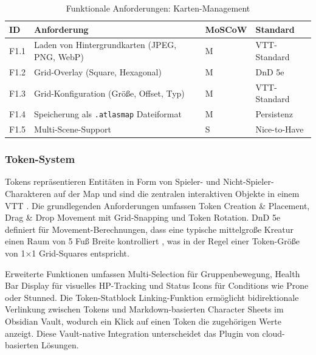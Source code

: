 \begin{table}[htbp]
	\centering
	\small
	\caption{Funktionale Anforderungen: Karten-Management}
	\label{tab:funktionale-anforderungen-karten}
	\begin{tabularx}{\textwidth}{llXl}
		\toprule
		\textbf{ID} & \textbf{Anforderung}                                         & \textbf{MoSCoW} & \textbf{Standard} \\
		\midrule
		F1.1        & Laden von Hintergrundkarten (\ac{JPEG}, \ac{PNG}, \ac{WebP}) & M               & \ac{VTT}-Standard \\
		F1.2        & Grid-Overlay (Square, Hexagonal)                             & M               & \ac{DnD} 5e       \\
		F1.3        & Grid-Konfiguration (Größe, Offset, Typ)                      & M               & \ac{VTT}-Standard \\
		F1.4        & Speicherung als \texttt{.atlasmap} Dateiformat               & M               & Persistenz        \\
		F1.5        & Multi-Scene-Support                                          & S               & Nice-to-Have      \\
		\bottomrule
	\end{tabularx}
\end{table}

\subsubsection{Token-System}

Tokens repräsentieren Entitäten in Form von Spieler- und Nicht-Spieler-Charakteren auf der Map und sind die zentralen interaktiven Objekte in einem \ac{VTT} \autocite{FoundryTokens2024}. Die grundlegenden Anforderungen umfassen Token Creation \& Placement, Drag \& Drop Movement mit Grid-Snapping und Token Rotation. \ac{DnD} 5e definiert für Movement-Berechnungen, dass eine typische mittelgroße Kreatur einen Raum von 5 Fuß Breite kontrolliert \autocite{DnDBasicRules2014}, was in der Regel einer Token-Größe von 1×1 Grid-Squares entspricht.

Erweiterte Funktionen umfassen Multi-Selection für Gruppenbewegung, Health Bar Display für visuelles \ac{HP}-Tracking und Status Icons für Conditions wie Prone oder Stunned. Die Token-Statblock Linking-Funktion ermöglicht bidirektionale Verlinkung zwischen Tokens und Markdown-basierten Character Sheets im Obsidian Vault, wodurch ein Klick auf einen Token die zugehörigen Werte anzeigt. Diese Vault-native Integration unterscheidet das Plugin von cloud-basierten Lösungen.

